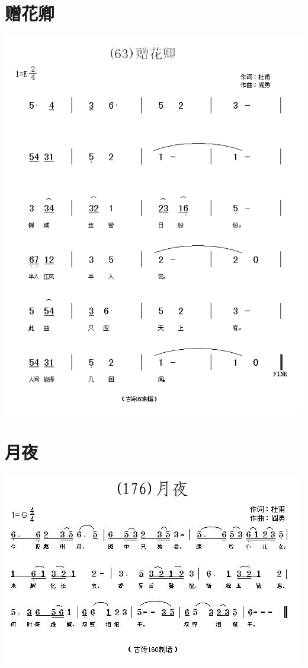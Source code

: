 \documentclass[cn,pad,twocol]{elegantbook}
\begin{document}
\section{赠花卿}
    \includegraphics[width=\textwidth]{dongxiao/20200808-赠花卿-杜甫.jpg}    
\section{月夜}
    \includegraphics[width=\textwidth]{dongxiao/20200808-月夜-杜甫.jpg}                     
\end{document}
